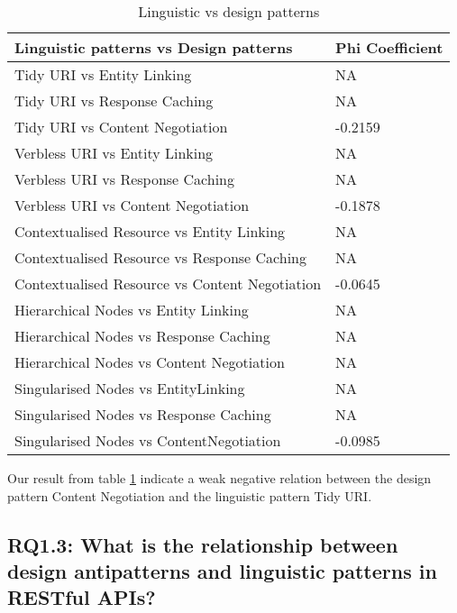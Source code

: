\documentclass[a4paper,12pt]{article}
\begin{document}
\begin{table}[hbt!]
    \centering
    \begin{tabular}{|p{90mm}|p{50mm}|}
\hline \textbf{Linguistic patterns vs Design patterns} & \textbf{Phi Coefficient} 
\\ \hline 
Tidy URI vs Entity Linking & NA
\\ \hline
Tidy URI vs Response Caching & NA
\\ \hline
Tidy URI vs Content Negotiation & -0.2159
\\ \hline
Verbless URI vs Entity Linking & NA
\\ \hline
Verbless URI vs Response Caching & NA
\\ \hline
Verbless URI vs Content Negotiation & -0.1878
\\ \hline
Contextualised Resource vs Entity Linking & NA
\\ \hline
Contextualised Resource vs Response Caching & NA
\\ \hline
Contextualised Resource vs Content Negotiation & -0.0645
\\ \hline
Hierarchical Nodes vs Entity Linking & NA
\\ \hline
Hierarchical Nodes vs Response Caching & NA
\\ \hline
Hierarchical Nodes vs Content Negotiation & NA
\\ \hline
Singularised Nodes vs EntityLinking & NA
\\ \hline
Singularised Nodes vs Response Caching & NA
\\ \hline
Singularised Nodes vs ContentNegotiation & -0.0985
\\ \hline
    \end{tabular}
    \caption{Linguistic vs design patterns}
    \label{tab:Linguistic vs design patterns}
\end{table}

\clearpage

Our result from table \ref{tab:Linguistic vs design patterns} indicate a weak negative relation between the design pattern Content Negotiation and the linguistic pattern Tidy URI. 

\subsection{\textbf{RQ1.3:} What is the relationship between design antipatterns and linguistic patterns in RESTful APIs?}
\end{document}
